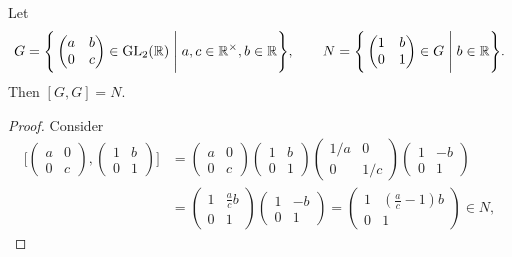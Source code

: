 \newpage

\begin{example}
  Let \[
    G = \Bigg\{
      \begin{pmatrix}
        a & b \\
        0 & c
      \end{pmatrix} \in \operatorname{GL}_2(\mathbb{R}) \Biggm| a, c \in \mathbb{R}^\times, b \in \mathbb{R}
    \Bigg\},
    \qquad
    N = \Bigg\{
      \begin{pmatrix}
        1 & b \\
        0 & 1
      \end{pmatrix} \in G \Biggm| b \in \mathbb{R}
    \Bigg\}.
  \]
  Then \([G,G] = N\).
\end{example}
\begin{proof}
  Consider \begin{align*}
    \Bigg[
      \begin{pmatrix}
        a & 0 \\
        0 & c
      \end{pmatrix},
      \begin{pmatrix}
        1 & b \\
        0 & 1
      \end{pmatrix}  
    \Bigg]
    &= \begin{pmatrix}
      a & 0 \\
      0 & c
    \end{pmatrix}
    \begin{pmatrix}
      1 & b \\
      0 & 1
    \end{pmatrix}
    \begin{pmatrix}
      1/a & 0 \\
      0 & 1/c
    \end{pmatrix}
    \begin{pmatrix}
      1 & -b \\
      0 & 1
    \end{pmatrix} \\
    &= \begin{pmatrix}
      1 & \frac{a}{c}b \\
      0 & 1
    \end{pmatrix}
    \begin{pmatrix}
      1 & -b \\
      0 & 1
    \end{pmatrix}
    = \begin{pmatrix}
      1 & (\frac{a}{c}-1)b \\
      0 & 1
    \end{pmatrix} \in N,

\end{align*}
\end{proof}
